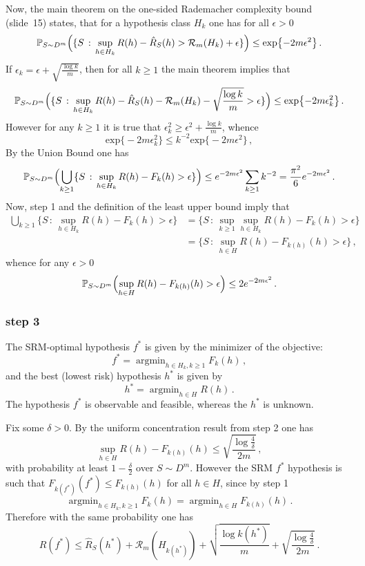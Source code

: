 \documentclass[a4paper]{article}
\newcommand{\pr}{\mathbb{P}}
\newcommand{\argmin}{\mathop{\text{argmin}}}
\begin{document}
Now, the main theorem on the one-sided Rademacher complexity bound (slide~15) states,
that for a hypothesis class $H_k$ one has for all $\epsilon>0$
\[ \pr_{S\sim D^m}\Bigl( \{S\,:\,
    \sup_{h\in H_k} R(h) - \hat{R}_S(h) > \mathcal{R}_m(H_k) + \epsilon\}
  \Bigr) \leq \text{exp}\bigl\{-2m\epsilon^2\bigr\}
  \,. \]
If $\epsilon_k = \epsilon + \sqrt{\frac{\log k}{m}}$, then for all $k\geq 1$ the main
theorem implies that
\[ \pr_{S\sim D^m}\Bigl( \{S\,:\,
    \sup_{h\in H_k} R(h) - \hat{R}_S(h) - \mathcal{R}_m(H_k) - \sqrt{\frac{\log k}{m}} > \epsilon\}
  \Bigr) \leq \text{exp}\bigl\{-2m\epsilon_k^2\bigr\}
  \,. \]
However for any $k\geq 1$ it is true that $\epsilon_k^2 \geq \epsilon^2 + \frac{\log k}{m}$,
whence
\[ \text{exp}\bigl\{-2m\epsilon_k^2\bigr\}
  \leq k^{-2} \text{exp}\bigl\{-2m\epsilon^2\bigr\}
  \,,\]
By the Union Bound one has
\[ \pr_{S\sim D^m}\Bigl(
  \bigcup_{k\geq 1} \{S\,:\, \sup_{h\in H_k} R(h) - F_k(h) > \epsilon\}
  \Bigr) \leq e^{-2m\epsilon^2} \sum_{k\geq 1} k^{-2}
  = \frac{\pi^2}{6} e^{-2m\epsilon^2}
  \,. \]
Now, step 1 and the definition of the least upper bound imply that
\begin{align*}
  \bigcup_{k\geq 1} \{S\,:\, \sup_{h\in H_k} R(h) - F_k(h) > \epsilon\}
    &= \{S\,:\, \sup_{k\geq 1} \sup_{h\in H_k} R(h) - F_k(h) > \epsilon\}\\
    &= \{S\,:\, \sup_{h\in H} R(h) - F_{k(h)}(h) > \epsilon\} \,,
\end{align*}
whence for any $\epsilon>0$
\[ \pr_{S\sim D^m}\Bigl(
  \sup_{h\in H} R(h) - F_{k(h)}(h) > \epsilon
  \Bigr) \leq 2 e^{-2m\epsilon^2}
  \,. \]


\subsubsection*{step 3} %
\label{ssub:step_1d3}

The SRM-optimal hypothesis $f^*$ is given by the minimizer of the objective:
\[ f^* = \argmin_{h\in H_k, k\geq1} F_k(h) \,, \]
and the best (lowest risk) hypothesis $h^*$ is given by
\[ h^* = \argmin_{h\in H} R(h) \,. \]
The hypothesis $f^*$ is observable and feasible, whereas the $h^*$ is unknown.

\noindent Fix some $\delta>0$. By the uniform concentration result from step 2 one
has
\[ \sup_{h\in H} R(h) - F_{k(h)}(h) \leq \sqrt{\frac{\log\frac{4}{\delta}}{2m}}
  \,,\]
with probability at least $1-\frac{\delta}{2}$ over $S\sim D^m$. However the SRM
$f^*$ hypothesis is such that $F_{k(f^*)}(f^*) \leq F_{k(h)}(h)$ for all $h\in H$,
since by step 1
\[\argmin_{h\in H_k, k\geq1} F_k(h) = \argmin_{h\in H} F_{k(h)}(h) \,. \]
Therefore with the same probability one has
\[ R(f^*) \leq \hat{R}_S(h^*) + \mathcal{R}_m(H_{k(h^*)})
        + \sqrt{\frac{\log k(h^*)}{m}} + \sqrt{\frac{\log\frac{4}{\delta}}{2m}}
  \,. \]
\end{document}
